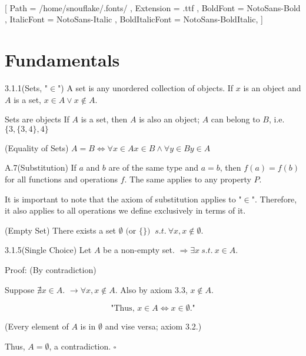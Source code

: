 \documentclass[letterpaper]{article}
\title{\vspace{-3.0cm}\textbf{\T}}
\date{\vspace{-1cm}}
\author{~}
\begin{document}
\setmainfont{NotoSans-Regular}[
  Path           = /home/snouflake/.fonts/ ,
  Extension      = .ttf ,
  BoldFont       = NotoSans-Bold ,
  ItalicFont     = NotoSans-Italic ,
  BoldItalicFont = NotoSans-BoldItalic,
  ] 

\maketitle

\section*{Fundamentals}

\begin{defbox}{3.1.1}{(Sets, "$\in$")}
  A set is any unordered collection of objects. If $x$ is an object and $A$ is a set, $x \in A \lor x \notin A$.
\end{defbox}

\begin{axbox}{3.1}{Sets are objects}
  If $A$ is a set, then $A$ is also an object; $A$ can belong to $B$, i.e. $\{3,\{3,4\},4\}$
\end{axbox}

\begin{axbox}{3.2}{(Equality of Sets)}
  $A = B \iff \forall x \in A x \in B \land \forall y \in B y \in A$
\end{axbox}

\begin{axbox}{A.7}{(Substitution)}
  If $a$ and $b$ are of the same type and $a = b$, then $f(a) = f(b)$ for all functions and operations $f$. The same applies to any property $P$.
\end{axbox}

It is important to note that the axiom of substitution applies to "$\in$". Therefore, it also applies to all operations we define exclusively in terms of it.

\begin{axbox}{3.3}{(Empty Set)}
  There exists a set $\emptyset \text{ (or $\{\}$) } ~s.t.~ \forall x, x \notin \emptyset$.
\end{axbox}

\begin{lebox}{3.1.5}{(Single Choice)}
  Let $A$ be a non-empty set. $\Rightarrow \exists x ~s.t.~ x \in A$.
  \begin{paragraph}{Proof:} 
    (By contradiction)

    Suppose $\nexists x \in A$.
    $\to \forall x, x \notin A$.
    Also by axiom 3.3, $x \notin A$.
    
    \[
      \text{"Thus, } x \in A \iff x \in \emptyset.\text{"}
    \]

    (Every element of $A$ is in $\emptyset$ and vise versa; axiom 3.2.)
    
    Thus, $A = \emptyset$, a contradiction. $\square$
  \end{paragraph}
\end{lebox}
\end{document}
